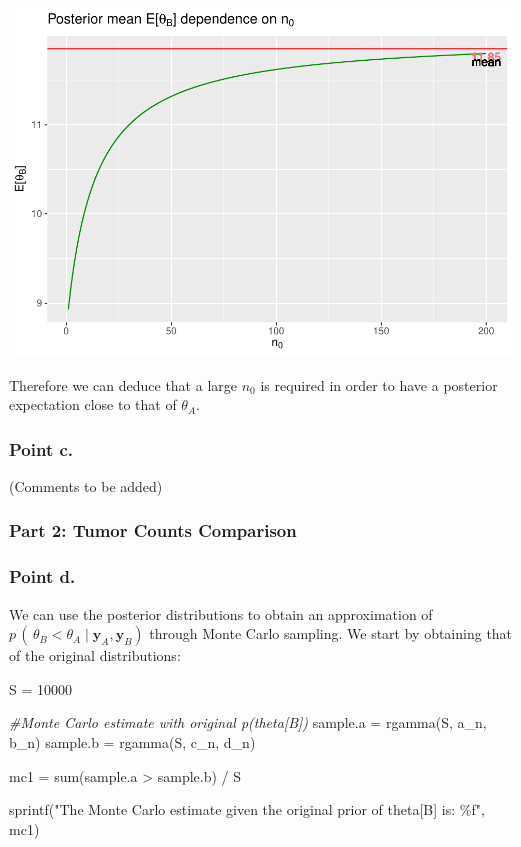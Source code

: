 \documentclass[
  11pt,
]{article}
\newenvironment{Shaded}{\begin{snugshade}}{\end{snugshade}}
\newcommand{\CommentTok}[1]{\textcolor[rgb]{0.56,0.35,0.01}{\textit{#1}}}
\newcommand{\DecValTok}[1]{\textcolor[rgb]{0.00,0.00,0.81}{#1}}
\newcommand{\FunctionTok}[1]{\textcolor[rgb]{0.00,0.00,0.00}{#1}}
\newcommand{\NormalTok}[1]{#1}
\newcommand{\OtherTok}[1]{\textcolor[rgb]{0.56,0.35,0.01}{#1}}
\newcommand{\SpecialCharTok}[1]{\textcolor[rgb]{0.00,0.00,0.00}{#1}}
\newcommand{\StringTok}[1]{\textcolor[rgb]{0.31,0.60,0.02}{#1}}
\begin{document}
\begin{center}\includegraphics[width=0.6\linewidth]{1_hw_bs_code_files/figure-latex/unnamed-chunk-4-1} \end{center}

Therefore we can deduce that a large \(n_0\) is required in order to
have a posterior expectation close to that of \(\theta_A\).

\hypertarget{point-c.-1}{%
\subsubsection{Point c.}\label{point-c.-1}}

(Comments to be added)

\hypertarget{part-2-tumor-counts-comparison}{%
\subsubsection{Part 2: Tumor Counts
Comparison}\label{part-2-tumor-counts-comparison}}

\hypertarget{point-d.-1}{%
\subsubsection{Point d.}\label{point-d.-1}}

We can use the posterior distributions to obtain an approximation of
\(p \,( \, \theta_B < \theta_A \; | \; \mathbf{y}_A, \mathbf{y}_B)\)
through Monte Carlo sampling. We start by obtaining that of the original
distributions: \scriptsize

\begin{Shaded}
\begin{Highlighting}[]
\NormalTok{S }\OtherTok{=} \DecValTok{10000}

\CommentTok{\#Monte Carlo estimate with original p(theta[B])}
\NormalTok{sample.a }\OtherTok{=} \FunctionTok{rgamma}\NormalTok{(S, a\_n, b\_n)}
\NormalTok{sample.b }\OtherTok{=} \FunctionTok{rgamma}\NormalTok{(S, c\_n, d\_n)}

\NormalTok{mc1 }\OtherTok{=} \FunctionTok{sum}\NormalTok{(sample.a }\SpecialCharTok{\textgreater{}}\NormalTok{ sample.b) }\SpecialCharTok{/}\NormalTok{ S}

\FunctionTok{sprintf}\NormalTok{(}\StringTok{"The Monte Carlo estimate given the original prior of theta[B] is: \%f"}\NormalTok{, mc1)}
\end{Highlighting}
\end{Shaded}
\end{document}
